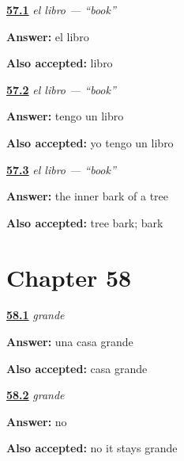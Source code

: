 \noindent\begin{minipage}[t]{\linewidth}
\raggedright
\hyperlink{review-ES-C43-libro-article}{\textbf{57.1}} \emph{el libro — \textquotedblleft{}book\textquotedblright{}}\par
\small \textbf{Answer:} el libro\par
\footnotesize \textbf{Also accepted:} libro
\end{minipage}\par\medskip

\noindent\begin{minipage}[t]{\linewidth}
\raggedright
\hyperlink{review-ES-C43-libro-have}{\textbf{57.2}} \emph{el libro — \textquotedblleft{}book\textquotedblright{}}\par
\small \textbf{Answer:} tengo un libro\par
\footnotesize \textbf{Also accepted:} yo tengo un libro
\end{minipage}\par\medskip

\noindent\begin{minipage}[t]{\linewidth}
\raggedright
\hyperlink{review-ES-C43-libro-bark}{\textbf{57.3}} \emph{el libro — \textquotedblleft{}book\textquotedblright{}}\par
\small \textbf{Answer:} the inner bark of a tree\par
\footnotesize \textbf{Also accepted:} tree bark; bark
\end{minipage}\par\medskip

\section*{Chapter 58}

\noindent\begin{minipage}[t]{\linewidth}
\raggedright
\hyperlink{review-ES-C09-grande-order}{\textbf{58.1}} \emph{grande}\par
\small \textbf{Answer:} una casa grande\par
\footnotesize \textbf{Also accepted:} casa grande
\end{minipage}\par\medskip

\noindent\begin{minipage}[t]{\linewidth}
\raggedright
\hyperlink{review-ES-C09-grande-invariant}{\textbf{58.2}} \emph{grande}\par
\small \textbf{Answer:} no\par
\footnotesize \textbf{Also accepted:} no it stays grande
\end{minipage}\par\medskip

